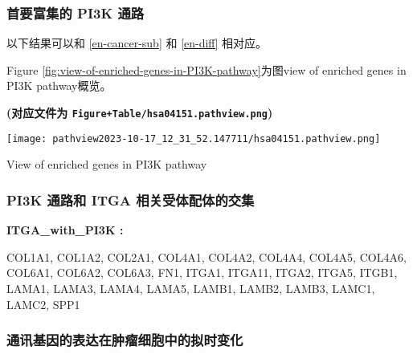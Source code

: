 \documentclass[
]{article}
\begin{document}
\hypertarget{ux9996ux8981ux5bccux96c6ux7684-pi3k-ux901aux8def}{%
\subsubsection{首要富集的 PI3K 通路}\label{ux9996ux8981ux5bccux96c6ux7684-pi3k-ux901aux8def}}

以下结果可以和 \ref{en-cancer-sub} 和 \ref{en-diff} 相对应。

Figure \ref{fig:view-of-enriched-genes-in-PI3K-pathway}为图view of enriched genes in PI3K pathway概览。

\textbf{(对应文件为 \texttt{Figure+Table/hsa04151.pathview.png})}

\def\@captype{figure}
\begin{center}
\texttt{[image: pathview2023-10-17\_12\_31\_52.147711/hsa04151.pathview.png]}
\caption{View of enriched genes in PI3K pathway}\label{fig:view-of-enriched-genes-in-PI3K-pathway}
\end{center}

\hypertarget{pi3k-ux901aux8defux548c-itga-ux76f8ux5173ux53d7ux4f53ux914dux4f53ux7684ux4ea4ux96c6}{%
\subsubsection{PI3K 通路和 ITGA 相关受体配体的交集}\label{pi3k-ux901aux8defux548c-itga-ux76f8ux5173ux53d7ux4f53ux914dux4f53ux7684ux4ea4ux96c6}}

\begin{center}\begin{tcolorbox}[colback=gray!10, colframe=gray!50, width=0.9\linewidth, arc=1mm, boxrule=0.5pt]
\textbf{
ITGA\_with\_PI3K
:}

\vspace{0.5em}

    COL1A1, COL1A2, COL2A1, COL4A1, COL4A2, COL4A4, COL4A5,
COL4A6, COL6A1, COL6A2, COL6A3, FN1, ITGA1, ITGA11, ITGA2,
ITGA5, ITGB1, LAMA1, LAMA3, LAMA4, LAMA5, LAMB1, LAMB2,
LAMB3, LAMC1, LAMC2, SPP1

\vspace{2em}
\end{tcolorbox}
\end{center}

\hypertarget{ux901aux8bafux57faux56e0ux7684ux8868ux8fbeux5728ux80bfux7624ux7ec6ux80deux4e2dux7684ux62dfux65f6ux53d8ux5316}{%
\subsubsection{通讯基因的表达在肿瘤细胞中的拟时变化}\label{ux901aux8bafux57faux56e0ux7684ux8868ux8fbeux5728ux80bfux7624ux7ec6ux80deux4e2dux7684ux62dfux65f6ux53d8ux5316}}
\end{document}
